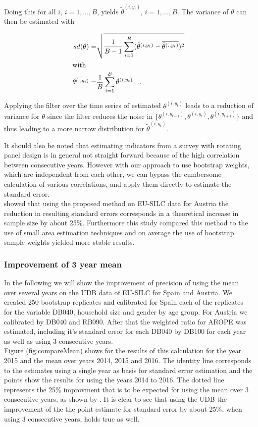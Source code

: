 \documentclass{scrartcl}
\begin{document}
Doing this for all $i$, $i=1,\ldots,B$, yields $\tilde{\theta}^{(i,y_t)}$, $i=1,\ldots,B$. The variance of $\theta$ can then be estimated with

\begin{align*}
  sd(\theta) =& \sqrt{\frac{1}{B-1}\sum\limits_{i=1}^B (\tilde{\theta}^{(i,y_t)}-\overline{\tilde{\theta}^{(.,y_t)}})^2}\\
  \intertext{with}
  \overline{\tilde{\theta}^{(.,y_t)}}=&\frac{1}{B}\sum\limits_{i=1}^B\tilde{\theta}^{(i,y_t)} \quad.
\end{align*}

Applying the filter over the time series of estimated $\theta^{(i,y_t)}$ leads to a reduction of variance for $\theta$ since the filter reduces the noise in $\{\theta^{(i,y_{t-1})},\theta^{(i,y_t)},\theta^{(i,y_{t+1})}\}$ and thus leading to a more narrow distribution for $\tilde{\theta}^{(i,y_t)}$.

It should also be noted that estimating indicators from a survey with rotating panel design is in general not straight forward because of the high correlation between consecutive years. However with our approach to use bootstrap weights, which are independent from each other, we can bypass the cumbersome calculation of various correlations, and apply them directly to estimate the standard error.\\
\citep{silcstudy} showed that using the proposed method on EU-SILC data for Austria the reduction in resulting standard errors corresponds in a theoretical increase in sample size by about 25$\%$. Furthermore this study compared this method to the use of small area estimation techniques and on average the use of bootstrap sample weights yielded more stable results.\\

\subsubsection{Improvement of 3 year mean}
In the following we will show the improvement of precision of using the mean over several years on the UDB data of EU-SILC for Spain and Austria.
We created 250 bootstrap replicates and calibrated for Spain each of the replicates for the variable DB040, household size and gender by age group. For Austria we calibrated by DB040 and RB090. After that the weighted ratio for AROPE was estimated, including it's standard error for each DB040 by DB100 for each year as well as using 3 consecutive years.\\
Figure \@ref(fig:compareMean) shows for the results of this calculation for the year 2015 and the mean over years 2014, 2015 and 2016.
The identity line corresponds to the estimates using a single year as basis for standard error estimation and the points show the results for using the years 2014 to 2016. The dotted line represents the 25$\%$ improvment that is to be expected for using the mean over 3 consecutive years, as shown by \citep{silcstudy}. It is clear to see that using the UDB the improvement of the the point estimate for standard error by about 25$\%$, when using 3 consecutive years, holds true as well.
\end{document}

